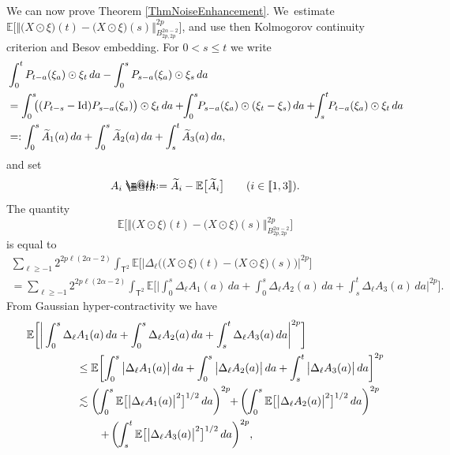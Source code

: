 \documentclass[10pt]{amsart}
\makeatletter
\theoremstyle{definition}
\newcommand\bbE{\mathbb{E}}
\newcommand*{\defeq}{\mathrel{\rlap{%
\raisebox{0.3ex}{$\m@th\cdot$}}%
\raisebox{-0.3ex}{$\m@th\cdot$}}%
=}
\newcommand{\norme}[1]{\Vert #1 \Vert}
\makeatother
\begin{document}
We can now prove Theorem \ref{ThmNoiseEnhancement}. We~estimate $\bbE\bigl[ \big\Vert\bigl(X\odot\xi\bigr)(t)-\bigl(X\odot\xi\bigr)(s)\big\Vert_{B^{2\alpha-2}_{2p,2p}}^{2p}\bigr]$, and use then Kolmogorov continuity criterion and Besov embedding. For $0<s\leq t$ we write
\begin{align*}
&\int_0^t P_{t-a}(\xi_a)\odot\xi_t \, da - \int_0^s P_{s-a}(\xi_a)\odot \xi_s \, da \\
&= \int_0^s \hspace{-0.1cm} \bigl( (P_{t-s} - \textrm{Id})P_{s-a}(\xi_a) \bigr)\odot\xi_t \,da + \hspace{-0.1cm}\int_0^s \hspace{-0.1cm}P_{s-a}(\xi_a) \odot (\xi_t-\xi_s) \,da + \hspace{-0.1cm}\int_s^t \hspace{-0.1cm}P_{t-a}(\xi_a)\odot\xi_t \,da \\
& =: \int_0^s \widetilde A_1(a)\,da +\int_0^s \widetilde A_2(a)\,da + \int_s^t \widetilde A_3(a)\,da,
\end{align*}
and set
\[
A_i \defeq \widetilde A_i - \bbE\bigl[\widetilde A_i\bigr] \qquad (i\in [\![1,3 ]\!]).
\]
The quantity
\[
\bbE\bigl[\norme{\bigl(X\odot\xi\bigr)(t)-\bigl(X\odot\xi\bigr)(s)}_{B^{2\alpha-2}_{2p,2p}}^{2p}\bigr]
\]
is equal to
\begin{multline*}
\sum_{\ell\geq -1} 2^{2p\ell(2\alpha-2)} \int_{\mathsf{T}^2}\bbE\bigl[ \big|\Delta_\ell \bigl(\bigl(X\odot\xi\bigr)(t)-\bigl(X\odot\xi\bigr)(s)\bigr) \big|^{2p}\bigr] \\
= \sum_{\ell\geq -1} 2^{2p\ell(2\alpha-2)}\int_{\mathsf{T}^2} \bbE\biggl[ \bigg| \int_0^s \Delta_\ell A_1(a)\,da + \int_0^s \Delta_\ell A_2(a)\,da + \int_s^t \Delta_\ell A_3(a)\,da \bigg|^{2p}\biggr].
\end{multline*}
From Gaussian hyper-contractivity we have
\begin{align*}
\bbE\biggl[ \bigg| \int_0^s \Delta_\ell &A_1(a)\,da + \int_0^s \Delta_\ell A_2(a)\,da + \int_s^t \Delta_\ell A_3(a)\,da \bigg|^{2p}\biggr]
\\
&\leq\bbE\biggl[ \int_0^s \big|\Delta_\ell A_1(a)\big|\,da + \int_0^s \big|\Delta_\ell A_2(a)\big|\,da + \int_s^t \big|\Delta_\ell A_3(a)\big|\,da \biggr]^{2p}
\\
&\lesssim \biggl(\hspace{-0.03cm}\int_0^s\bbE\bigl[ \big|\Delta_\ell A_1(a)\big|^2\bigr]^{1/2}\,da\biggr)^{2p} \hspace{-0.1cm}+\hspace{-0.03cm} \biggl(\hspace{-0.03cm}\int_0^s\bbE\bigl[ \big|\Delta_\ell A_2(a)\big|^2\bigr]^{1/2}\,da\biggr)^{2p} \hspace{-0.1cm} \\
&\qquad+\hspace{-0.03cm} \biggl(\hspace{-0.03cm}\int_s^t\bbE\bigl[ \big|\Delta_\ell A_3(a)\big|^2 \bigr]^{1/2}\,da\biggr)^{2p},
\end{align*}
\end{document}
